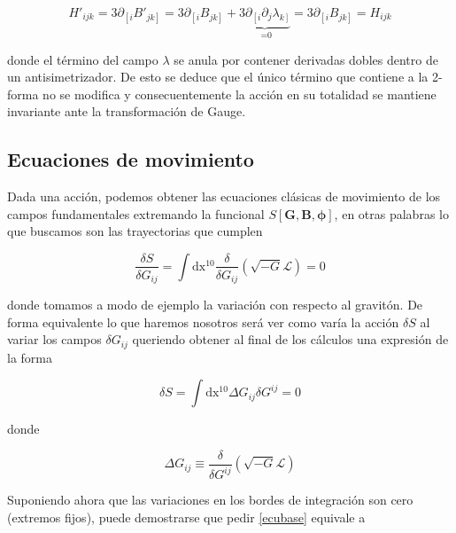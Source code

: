 \documentclass{article}
\numberwithin{equation}{section}
\begin{document}
\begin{equation*}
H'_{i j k} = 3 \partial_{\left[ i \right.} B'_{\left. j k\right]} = 3 \partial_{\left[ i \right.} B_{\left. j k\right]} + \underbrace{3 \partial_{\left[ i \right.} \partial_j \lambda_{\left. k \right]}}_{\text{ =0}} = 3 \partial_{\left[ i \right.} B_{\left. j k\right]} = H_{i j k}
\end{equation*}

donde el término del campo $ \lambda $ se anula por contener derivadas dobles dentro de un antisimetrizador. De esto se deduce que el único término que contiene a la 2-forma no se modifica y consecuentemente la acción en su totalidad se mantiene invariante ante la transformación de Gauge.

\subsection{\textcolor{teal!60!white}{Ecuaciones de movimiento}}\label{ecu}

Dada una acción, podemos obtener las ecuaciones clásicas de movimiento de los campos fundamentales extremando la funcional $S[\textbf{G},\textbf{B},\pmb{\phi}] $, en otras palabras lo que buscamos son las trayectorias que cumplen

\begin{equation*}
\frac{\delta S}{\delta G_{ij}} = \int\mathrm{dx^{10}} \frac{\delta}{\delta G_{ij}} \left(\sqrt{-G} \mathscr{L}\right)=0
\end{equation*}

donde tomamos a modo de ejemplo la variación con respecto al gravitón. De forma equivalente lo que haremos nosotros será ver como varía la acción $\delta S $ al variar los campos $ \delta G_{i j} $ queriendo obtener al final de los cálculos una expresión de la forma

\begin{equation}\label{ecubase}
\delta S = \int \mathrm{dx^{10}} \Delta G_{ij} \delta G^{ij} = 0
\end{equation} 

donde 

\begin{equation*}
\Delta G_{ij} \equiv \frac{\delta}{\delta G^{ij}} \left(\sqrt{-G} \mathscr{L}\right)
\end{equation*}

Suponiendo ahora que las variaciones en los bordes de integración son cero (extremos fijos), puede demostrarse que pedir \ref{ecubase} equivale a 
\end{document}
